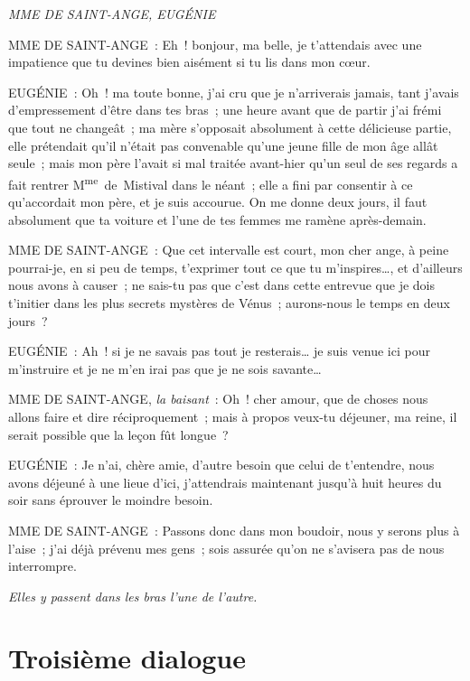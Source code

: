 \documentclass[french,twoside]{book} %
\begin{document}
\textit{MME DE SAINT-ANGE, EUGÉNIE}\par
\noindent MME DE SAINT-ANGE : Eh ! bonjour, ma belle, je t’attendais avec une impatience que tu devines bien aisément si tu lis dans mon cœur.\par
EUGÉNIE : Oh ! ma toute bonne, j’ai cru que je n’arriverais jamais, tant j’avais d’empressement d’être dans tes bras ; une heure avant que de partir j’ai frémi que tout ne changeât ; ma mère s’opposait absolument à cette délicieuse partie, elle prétendait qu’il n’était pas convenable qu’une jeune fille de mon âge allât seule ; mais mon père l’avait si mal traitée avant-hier qu’un seul de ses regards a fait rentrer M\textsuperscript{me} de Mistival dans le néant ; elle a fini par consentir à ce qu’accordait mon père, et je suis accourue. On me donne deux jours, il faut absolument que ta voiture et l’une de tes femmes me ramène après-demain.\par
MME DE SAINT-ANGE : Que cet intervalle est court, mon cher ange, à peine pourrai-je, en si peu de temps, t’exprimer tout ce que tu m’inspires…, et d’ailleurs nous avons à causer ; ne sais-tu pas que c’est dans cette entrevue que je dois t’initier dans les plus secrets mystères de Vénus ; aurons-nous le temps en deux jours ?\par
EUGÉNIE : Ah ! si je ne savais pas tout je resterais… je suis venue ici pour m’instruire et je ne m’en irai pas que je ne sois savante…\par
MME DE SAINT-ANGE, {\itshape la baisant} : Oh ! cher amour, que de choses nous allons faire et dire réciproquement ; mais à propos veux-tu déjeuner, ma reine, il serait possible que la leçon fût longue ?\par
EUGÉNIE : Je n’ai, chère amie, d’autre besoin que celui de t’entendre, nous avons déjeuné à une lieue d’ici, j’attendrais maintenant jusqu’à huit heures du soir sans éprouver le moindre besoin.\par
MME DE SAINT-ANGE : Passons donc dans mon boudoir, nous y serons plus à l’aise ; j’ai déjà prévenu mes gens ; sois assurée qu’on ne s’avisera pas de nous interrompre.\par
{\itshape Elles y passent dans les bras l’une de l’autre.}
\section[{Troisième dialogue}]{Troisième dialogue}
\label{d3}\renewcommand{\leftmark}{Troisième dialogue}
\end{document}
